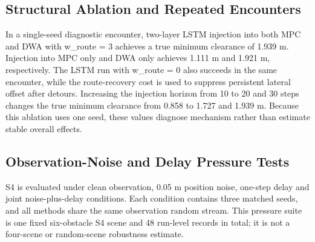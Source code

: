 \documentclass[10pt,a4paper]{article}
\begin{document}
\subsection{Structural Ablation and Repeated Encounters}

In a single-seed diagnostic encounter, two-layer LSTM injection into both MPC and DWA with w\_route = 3 achieves a true minimum clearance of 1.939 m. Injection into MPC only and DWA only achieves 1.111 m and 1.921 m, respectively. The LSTM run with w\_route = 0 also succeeds in the same encounter, while the route-recovery cost is used to suppress persistent lateral offset after detours. Increasing the injection horizon from 10 to 20 and 30 steps changes the true minimum clearance from 0.858 to 1.727 and 1.939 m. Because this ablation uses one seed, these values diagnose mechanism rather than estimate stable overall effects.

\subsection{Observation-Noise and Delay Pressure Tests}

S4 is evaluated under clean observation, 0.05 m position noise, one-step delay and joint noise-plus-delay conditions. Each condition contains three matched seeds, and all methods share the same observation random stream. This pressure suite is one fixed six-obstacle S4 scene and 48 run-level records in total; it is not a four-scene or random-scene robustness estimate.
\end{document}
